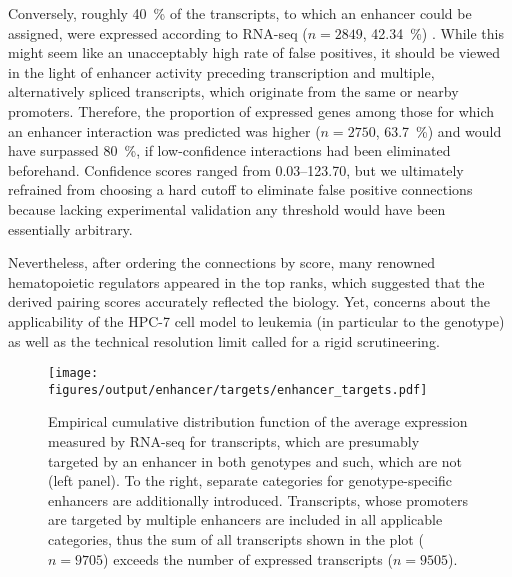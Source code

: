 Conversely, roughly \SI{40}{\percent} of the transcripts, to which an enhancer could be assigned, were expressed according to RNA-seq ($n\!=\!2849$, \SI{42.34}{\percent}) . While this might seem like an unacceptably high rate of false positives, it should be viewed in the light of enhancer activity preceding transcription\cite{Arner2015} and multiple, alternatively spliced transcripts, which originate from the same or nearby promoters. Therefore, the proportion of expressed genes among those for which an enhancer interaction was predicted was higher ($n\!=\!2750$, \SI{63.7}{\percent}) and would have surpassed \SI{80}{\percent}, if low-confidence interactions had been eliminated beforehand. Confidence scores ranged from \numrange{0.03}{123.70}, but we ultimately refrained from choosing a hard cutoff to eliminate false positive connections because lacking experimental validation any threshold would have been essentially arbitrary. 

Nevertheless, after ordering the connections by score, many renowned hematopoietic regulators appeared in the top ranks, which suggested that the derived pairing scores accurately reflected the biology. Yet, concerns about the applicability of the HPC-7 cell model to \mllafnine leukemia (in particular to the \dnmtchip genotype) as well as the technical resolution limit called for a rigid scrutineering.

\begin{figure}[!bht]
	\centering
	\texttt{[image: figures/output/enhancer/targets/enhancer\_targets.pdf]} 
	\caption{Empirical cumulative distribution function of the average expression measured by RNA-seq for transcripts, which are presumably targeted by an enhancer in both genotypes and such, which are not (left panel). To the right, separate categories for genotype-specific enhancers are additionally introduced. Transcripts, whose promoters are targeted by multiple enhancers are included in all applicable categories, thus the sum of all transcripts shown in the plot ($n\!=\!9705$) exceeds the number of expressed transcripts ($n\!=\!9505$).}
	\label{fig:enhancers:target_expression}
	
\end{figure}

